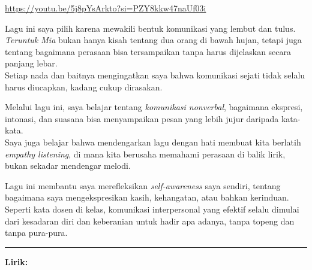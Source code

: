 \documentclass[
  letterpaper,
  DIV=11,
  numbers=noendperiod]{scrreprt}
\begin{document}
\url{https://youtu.be/5j8pYsArkto?si=PZY8kkw47naUf03i}

Lagu ini saya pilih karena mewakili bentuk komunikasi yang lembut dan
tulus.\\
\emph{Teruntuk Mia} bukan hanya kisah tentang dua orang di bawah hujan,
tetapi juga tentang bagaimana perasaan bisa tersampaikan tanpa harus
dijelaskan secara panjang lebar.\\
Setiap nada dan baitnya mengingatkan saya bahwa komunikasi sejati tidak
selalu harus diucapkan, kadang cukup dirasakan.

Melalui lagu ini, saya belajar tentang \emph{komunikasi nonverbal},
bagaimana ekspresi, intonasi, dan suasana bisa menyampaikan pesan yang
lebih jujur daripada kata-kata.\\
Saya juga belajar bahwa mendengarkan lagu dengan hati membuat kita
berlatih \emph{empathy listening}, di mana kita berusaha memahami
perasaan di balik lirik, bukan sekadar mendengar melodi.

Lagu ini membantu saya merefleksikan \emph{self-awareness} saya sendiri,
tentang bagaimana saya mengekspresikan kasih, kehangatan, atau bahkan
kerinduan.\\
Seperti kata dosen di kelas, komunikasi interpersonal yang efektif
selalu dimulai dari kesadaran diri dan keberanian untuk hadir apa
adanya, tanpa topeng dan tanpa pura-pura.

\begin{center}\rule{0.5\linewidth}{0.5pt}\end{center}

\textbf{Lirik:}
\end{document}
